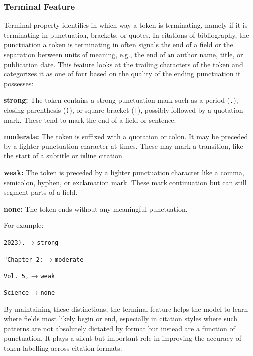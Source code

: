 \subsubsection{Terminal Feature}
Terminal property identifies in which way a token is terminating, namely if it is terminating in punctuation, brackets, or quotes. In citations of bibliography, the punctuation a token is terminating in often signals the end of a field or the separation between units of meaning, e.g., the end of an author name, title, or publication date.
This feature looks at the trailing characters of the token and categorizes it as one of four based on the quality of the ending punctuation it possesses:
\begin{compactitem}
\item \textbf{strong:} The token contains a strong punctuation mark such as a period (\texttt{.}), closing parenthesis (\texttt{)}), or square bracket (\texttt{]}), possibly followed by a quotation mark. These tend to mark the end of a field or sentence.
\item \textbf{moderate:} The token is suffixed with a quotation or colon. It may be preceded by a lighter punctuation character at times. These may mark a transition, like the start of a subtitle or inline citation.
\item \textbf{weak:} The token is preceded by a lighter punctuation character like a comma, semicolon, hyphen, or exclamation mark. These mark continuation but can still segment parts of a field.
\item \textbf{none:} The token ends without any meaningful punctuation.
\end{compactitem}
For example:
\begin{compactitem}
\item \texttt{2023).} → \texttt{strong}
\item \texttt{"Chapter 2:} → \texttt{moderate}
\item \texttt{Vol. 5,} → \texttt{weak}
\item \texttt{Science} → \texttt{none}
\end{compactitem}
By maintaining these distinctions, the terminal feature helps the model to learn where fields most likely begin or end, especially in citation styles where such patterns are not absolutely dictated by format but instead are a function of punctuation. It plays a silent but important role in improving the accuracy of token labelling across citation formats.
\clearpage


